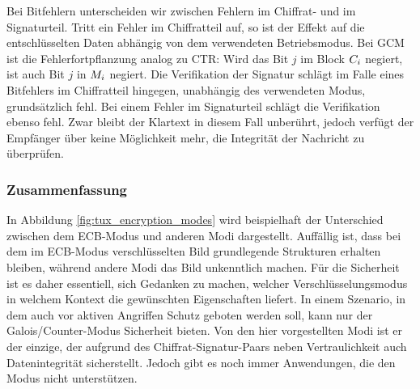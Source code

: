 Bei Bitfehlern unterscheiden wir zwischen Fehlern im Chiffrat- und im
Signaturteil. Tritt ein Fehler im Chiffratteil auf, so ist der Effekt
auf die entschlüsselten Daten abhängig von dem verwendeten
Betriebsmodus. Bei GCM ist die Fehlerfortpflanzung analog zu CTR: Wird
das Bit $j$ im Block $C_i$ negiert, ist auch Bit $j$ in
$M_i$ negiert. Die Verifikation der Signatur schlägt im Falle
eines Bitfehlers im Chiffratteil hingegen, unabhängig des verwendeten
Modus, grundsätzlich fehl. Bei einem Fehler im Signaturteil schlägt die
Verifikation ebenso fehl. Zwar bleibt der Klartext in diesem Fall
unberührt, jedoch verfügt der Empfänger über keine Möglichkeit mehr, die
Integrität der Nachricht zu überprüfen. 

\subsubsection{Zusammenfassung}
In Abbildung \ref{fig:tux_encryption_modes} wird beispielhaft der
Unterschied zwischen dem ECB-Modus und anderen Modi
dargestellt. Auffällig ist, dass bei dem im ECB-Modus verschlüsselten
Bild grundlegende Strukturen erhalten bleiben, während andere Modi das
Bild unkenntlich machen. Für die Sicherheit ist es daher essentiell,
sich Gedanken zu machen, welcher Verschlüsselungsmodus in welchem
Kontext die gewünschten Eigenschaften liefert. In einem Szenario, in dem
auch vor aktiven Angriffen Schutz geboten werden soll, kann nur der
Galois/Counter-Modus Sicherheit bieten.  Von den hier vorgestellten Modi
ist er der einzige, der aufgrund des Chiffrat-Signatur-Paars neben
Vertraulichkeit auch Datenintegrität sicherstellt. Jedoch gibt es noch
immer Anwendungen, die den Modus nicht unterstützen.

